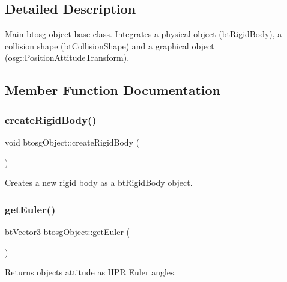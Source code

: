 \subsection{Detailed Description}
Main btosg object base class. Integrates a physical object (bt\+Rigid\+Body), a collision shape (bt\+Collision\+Shape) and a graphical object (osg\+::\+Position\+Attitude\+Transform). 

\subsection{Member Function Documentation}
\mbox{\label{classbtosgObject_a029dbe9134fa94e7355799f67fb2cd6d}} 
\subsubsection{\texorpdfstring{create\+Rigid\+Body()}{createRigidBody()}}
{\footnotesize\ttfamily void btosg\+Object\+::create\+Rigid\+Body (\begin{DoxyParamCaption}{ }\end{DoxyParamCaption})\hspace{0.3cm}{\ttfamily [inline]}}

Creates a new rigid body as a bt\+Rigid\+Body object. \mbox{\label{classbtosgObject_afef1fe06635566ab9cee134f72439e02}} 
\subsubsection{\texorpdfstring{get\+Euler()}{getEuler()}}
{\footnotesize\ttfamily bt\+Vector3 btosg\+Object\+::get\+Euler (\begin{DoxyParamCaption}{ }\end{DoxyParamCaption})\hspace{0.3cm}{\ttfamily [inline]}}

Returns object\textquotesingle{}s attitude as H\+PR Euler angles. \mbox{\label{classbtosgObject_a77a1434498d7a6d00c415042a995d119}} 
